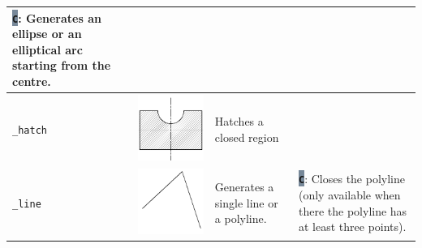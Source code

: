 \documentclass[..]{../IEEEphot}
\newcommand{\param}[1]{\colorbox{LightSlateGray}{\color{Navy}\texttt{\textbf{#1}}}}
\begin{document}
\begin{center}
\begin{longtable}{m{.1\linewidth}m{.2\linewidth}m{.3\linewidth}m{.3\linewidth}}
\param{C}: Generates an ellipse or an elliptical arc starting from the centre.
\\
\midrule
\texttt{\_hatch} & \includegraphics[width = 0.8\linewidth, keepaspectratio]{../images/jpg/_hatch.jpg} & Hatches a closed region & 
\\
\midrule
\texttt{\_line} & \includegraphics[width = 0.8\linewidth, keepaspectratio]{../images/jpg/_line.jpg} & Generates a single line or a polyline. & 
\param{C}: Closes the polyline (only available when there the polyline has at least three points). \\
\midrule

\end{longtable}
\end{center}
\end{document}
